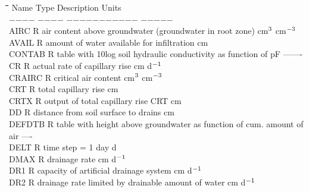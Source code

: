 \documentclass[11pt]{article}
\begin{document}
\begin{tabbing}
\hspace{1.27cm}\=\hspace{1.27cm}\=\hspace{1.27cm}\=\hspace{1.27cm}\=%
\hspace{1.27cm}\=\hspace{1.27cm}\=\hspace{1.27cm}\=\hspace{1.27cm}\=%
\hspace{1.27cm}\=\hspace{1.27cm}\=\kill
Name    \> \> Type   \> Description                                        \> \> \> \> \> \> \> Units\\
$-$$-$$-$$-$    \> \> $-$$-$$-$$-$   \> $-$$-$$-$$-$$-$$-$$-$$-$$-$$-$$-$                                        \> \> \> \> \> \> \> $-$$-$$-$$-$$-$\\
AIRC\> \> R\> air content above groundwater (groundwater in root zone)\> \> \> \> \> \> \> cm$^{{\rm 3}}$ cm$^{{\rm -3}}$\\
AVAIL\> \> R\> amount of water available for infiltration\> \> \> \> \> \> \> cm\\
CONTAB\> \> R\> table with 10log soil hydraulic conductivity as function of pF \> \> \> \> \> \> \> -------\\
CR\> \> R\> actual rate of capillary rise\> \> \> \> \> \> \> cm d$^{{\rm -1}}$\\
CRAIRC\> \> R\> critical air content\> \> \> \> \> \> \> cm$^{{\rm 3}}$ cm$^{{\rm -3}}$\\
CRT\> \> R\> total capillary rise\> \> \> \> \> \> \> cm\\
CRTX\> \> R\> output of total capillary rise CRT\> \> \> \> \> \> \> cm\\
DD\> \> R\> distance from soil surface to drains\> \> \> \> \> \> \> cm\\
DEFDTB\> \> R\> table with height above groundwater as function of cum. amount of air\> \> \> \> \> \> \> ----\\
DELT\> \> R\> time step = 1 day\> \> \> \> \> \> \> d\\
DMAX\> \> R\> drainage rate\> \> \> \> \> \> \> cm d$^{{\rm -1}}$\\
DR1\> \> R\> capacity of artificial drainage system\> \> \> \> \> \> \> cm d$^{{\rm -1}}$\\
DR2\> \> R\> drainage rate limited by drainable amount of water\> \> \> \> \> \> \> cm d$^{{\rm -1}}$\\

\end{tabbing}
\end{document}
